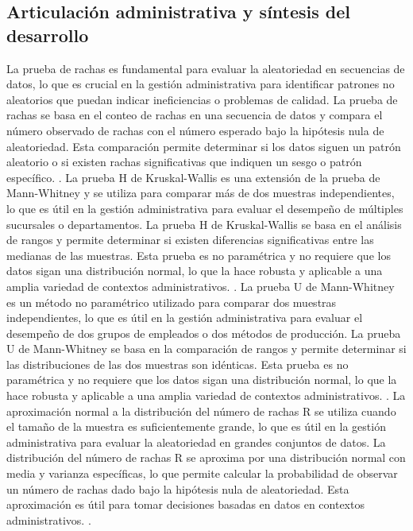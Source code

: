 {\subsection{Articulación administrativa y síntesis del desarrollo}
La prueba de rachas es fundamental para evaluar la aleatoriedad en secuencias de datos, lo que es crucial en la gestión administrativa para identificar patrones no aleatorios que puedan indicar ineficiencias o problemas de calidad. La prueba de rachas se basa en el conteo de rachas en una secuencia de datos y compara el número observado de rachas con el número esperado bajo la hipótesis nula de aleatoriedad. Esta comparación permite determinar si los datos siguen un patrón aleatorio o si existen rachas significativas que indiquen un sesgo o patrón específico. \citep{holmesBusiness2023,nistHandbook}.
La prueba H de Kruskal-Wallis es una extensión de la prueba de Mann-Whitney y se utiliza para comparar más de dos muestras independientes, lo que es útil en la gestión administrativa para evaluar el desempeño de múltiples sucursales o departamentos. La prueba H de Kruskal-Wallis se basa en el análisis de rangos y permite determinar si existen diferencias significativas entre las medianas de las muestras. Esta prueba es no paramétrica y no requiere que los datos sigan una distribución normal, lo que la hace robusta y aplicable a una amplia variedad de contextos administrativos. \citep{holmesBusiness2023,nistHandbook}.
La prueba U de Mann-Whitney es un método no paramétrico utilizado para comparar dos muestras independientes, lo que es útil en la gestión administrativa para evaluar el desempeño de dos grupos de empleados o dos métodos de producción. La prueba U de Mann-Whitney se basa en la comparación de rangos y permite determinar si las distribuciones de las dos muestras son idénticas. Esta prueba es no paramétrica y no requiere que los datos sigan una distribución normal, lo que la hace robusta y aplicable a una amplia variedad de contextos administrativos. \citep{holmesBusiness2023,nistHandbook}.
La aproximación normal a la distribución del número de rachas R se utiliza cuando el tamaño de la muestra es suficientemente grande, lo que es útil en la gestión administrativa para evaluar la aleatoriedad en grandes conjuntos de datos. La distribución del número de rachas R se aproxima por una distribución normal con media y varianza específicas, lo que permite calcular la probabilidad de observar un número de rachas dado bajo la hipótesis nula de aleatoriedad. Esta aproximación es útil para tomar decisiones basadas en datos en contextos administrativos. \citep{holmesBusiness2023,nistHandbook}.

}
